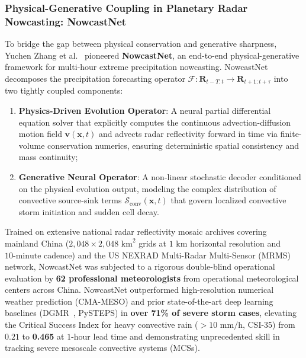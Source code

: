 \subsubsection{Physical-Generative Coupling in Planetary Radar Nowcasting: NowcastNet}
To bridge the gap between physical conservation and generative sharpness, Yuchen Zhang et al.~\cite{zhang2023nowcastnet} pioneered \textbf{NowcastNet}, an end-to-end physical-generative framework for multi-hour extreme precipitation nowcasting. NowcastNet decomposes the precipitation forecasting operator $\mathcal{F}: \mathbf{R}_{t-T:t} \to \mathbf{R}_{t+1:t+\tau}$ into two tightly coupled components:
\begin{enumerate}
    \item \textbf{Physics-Driven Evolution Operator}: A neural partial differential equation solver that explicitly computes the continuous advection-diffusion motion field $\mathbf{v}(\mathbf{x}, t)$ and advects radar reflectivity forward in time via finite-volume conservation numerics, ensuring deterministic spatial consistency and mass continuity;
    \item \textbf{Generative Neural Operator}: A non-linear stochastic decoder conditioned on the physical evolution output, modeling the complex distribution of convective source-sink terms $\mathcal{S}_{\text{conv}}(\mathbf{x}, t)$ that govern localized convective storm initiation and sudden cell decay.
\end{enumerate}
Trained on extensive national radar reflectivity mosaic archives covering mainland China ($2{,}048 \times 2{,}048\text{ km}^2$ grids at $1\text{ km}$ horizontal resolution and $10\text{-minute}$ cadence) and the US NEXRAD Multi-Radar Multi-Sensor (MRMS) network, NowcastNet was subjected to a rigorous double-blind operational evaluation by \textbf{62 professional meteorologists} from operational meteorological centers across China. NowcastNet outperformed high-resolution numerical weather prediction (CMA-MESO) and prior state-of-the-art deep learning baselines (DGMR~\cite{ravuri2021dgmr}, PySTEPS) in \textbf{over 71\% of severe storm cases}, elevating the Critical Success Index for heavy convective rain ($>10\text{ mm/h}$, CSI-35) from $0.21$ to \textbf{0.465} at $1\text{-hour}$ lead time and demonstrating unprecedented skill in tracking severe mesoscale convective systems (MCSs).

